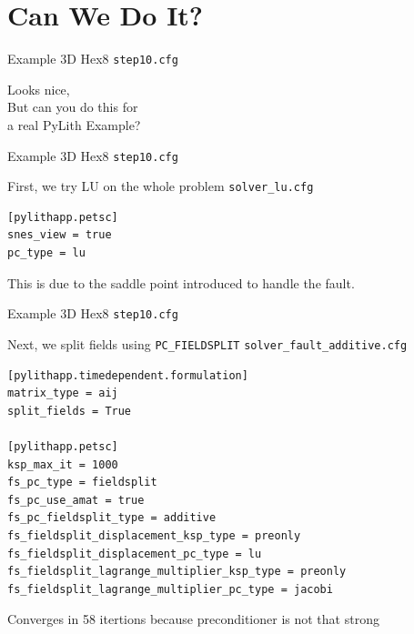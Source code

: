 \documentclass[dvipsnames]{beamer}
\begin{document}
\section{Can We Do It?}
%
\begin{frame}{Example 3D Hex8 \texttt{step10.cfg}}
\begin{center}\Huge
Looks nice,\\
But can you do this for\\
a real PyLith Example?
\end{center}
\end{frame}
%
\begin{frame}[fragile]{Example 3D Hex8 \texttt{step10.cfg}}

\begin{block}{First, we try LU on the whole problem \texttt{solver\_lu.cfg}}
\begin{verbatim}
[pylithapp.petsc]
snes_view = true
pc_type = lu
\end{verbatim}
\end{block}
\pause
\begin{center}
  \Huge {}
\end{center}
\pause
This is due to the saddle point introduced to handle the fault.
\end{frame}
%
\begin{frame}[fragile]{Example 3D Hex8 \texttt{step10.cfg}}

\begin{block}{Next, we split fields using \texttt{PC\_FIELDSPLIT} \texttt{solver\_fault\_additive.cfg}}
\small
\begin{verbatim}
[pylithapp.timedependent.formulation]
matrix_type = aij
split_fields = True

[pylithapp.petsc]
ksp_max_it = 1000
fs_pc_type = fieldsplit
fs_pc_use_amat = true
fs_pc_fieldsplit_type = additive
fs_fieldsplit_displacement_ksp_type = preonly
fs_fieldsplit_displacement_pc_type = lu
fs_fieldsplit_lagrange_multiplier_ksp_type = preonly
fs_fieldsplit_lagrange_multiplier_pc_type = jacobi
\end{verbatim}
\end{block}
\pause
\begin{center}
  Converges in 58 itertions because preconditioner is not that strong
\end{center}
\end{frame}
%
\end{document}
